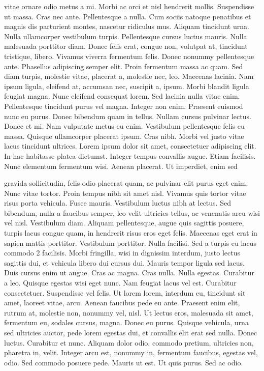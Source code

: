 \documentclass{article}
\begin{document}
vitae ornare odio metus a mi. Morbi ac orci et nisl hendrerit mollis. Suspendisse
ut massa. Cras nec ante. Pellentesque a nulla. Cum sociis natoque penatibus et
magnis dis parturient montes, nascetur ridiculus mus. Aliquam tincidunt urna.
Nulla ullamcorper vestibulum turpis. Pellentesque cursus luctus mauris.
Nulla malesuada porttitor diam. Donec felis erat, congue non, volutpat at,
tincidunt tristique, libero. Vivamus viverra fermentum felis. Donec nonummy
pellentesque ante. Phasellus adipiscing semper elit. Proin fermentum massa
ac quam. Sed diam turpis, molestie vitae, placerat a, molestie nec, leo. Maecenas lacinia. Nam ipsum ligula, eleifend at, accumsan nec, suscipit a, ipsum.
Morbi blandit ligula feugiat magna. Nunc eleifend consequat lorem. Sed lacinia
nulla vitae enim. Pellentesque tincidunt purus vel magna. Integer non enim.
Praesent euismod nunc eu purus. Donec bibendum quam in tellus. Nullam cursus pulvinar lectus. Donec et mi. Nam vulputate metus eu enim. Vestibulum
pellentesque felis eu massa.
Quisque ullamcorper placerat ipsum. Cras nibh. Morbi vel justo vitae lacus
tincidunt ultrices. Lorem ipsum dolor sit amet, consectetuer adipiscing elit. In
hac habitasse platea dictumst. Integer tempus convallis augue. Etiam facilisis.
Nunc elementum fermentum wisi. Aenean placerat. Ut imperdiet, enim sed

gravida sollicitudin, felis odio placerat quam, ac pulvinar elit purus eget enim.
Nunc vitae tortor. Proin tempus nibh sit amet nisl. Vivamus quis tortor vitae
risus porta vehicula.
Fusce mauris. Vestibulum luctus nibh at lectus. Sed bibendum, nulla a faucibus semper, leo velit ultricies tellus, ac venenatis arcu wisi vel nisl. Vestibulum
diam. Aliquam pellentesque, augue quis sagittis posuere, turpis lacus congue
quam, in hendrerit risus eros eget felis. Maecenas eget erat in sapien mattis
porttitor. Vestibulum porttitor. Nulla facilisi. Sed a turpis eu lacus commodo
2
facilisis. Morbi fringilla, wisi in dignissim interdum, justo lectus sagittis dui, et
vehicula libero dui cursus dui. Mauris tempor ligula sed lacus. Duis cursus enim
ut augue. Cras ac magna. Cras nulla. Nulla egestas. Curabitur a leo. Quisque
egestas wisi eget nunc. Nam feugiat lacus vel est. Curabitur consectetuer.
Suspendisse vel felis. Ut lorem lorem, interdum eu, tincidunt sit amet, laoreet vitae, arcu. Aenean faucibus pede eu ante. Praesent enim elit, rutrum at,
molestie non, nonummy vel, nisl. Ut lectus eros, malesuada sit amet, fermentum
eu, sodales cursus, magna. Donec eu purus. Quisque vehicula, urna sed ultricies
auctor, pede lorem egestas dui, et convallis elit erat sed nulla. Donec luctus.
Curabitur et nunc. Aliquam dolor odio, commodo pretium, ultricies non, pharetra in, velit. Integer arcu est, nonummy in, fermentum faucibus, egestas vel,
odio.
Sed commodo posuere pede. Mauris ut est. Ut quis purus. Sed ac odio.
\end{document}
